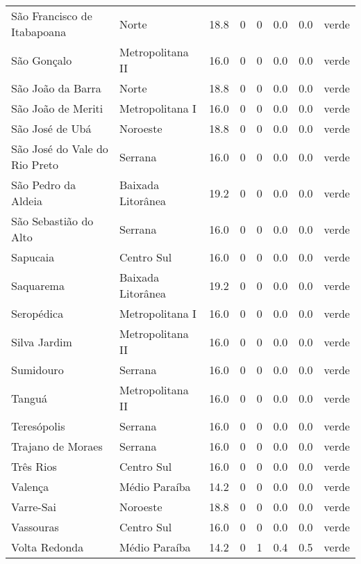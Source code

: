\begin{longtable}{l|lllllll}
  São Francisco de Itabapoana & Norte & 18.8 & 0 & 0 & 0.0 & 0.0 & verde \\ 
  São Gonçalo & Metropolitana II & 16.0 & 0 & 0 & 0.0 & 0.0 & verde \\ 
  São João da Barra & Norte & 18.8 & 0 & 0 & 0.0 & 0.0 & verde \\ 
  São João de Meriti & Metropolitana I & 16.0 & 0 & 0 & 0.0 & 0.0 & verde \\ 
  São José de Ubá & Noroeste & 18.8 & 0 & 0 & 0.0 & 0.0 & verde \\ 
  São José do Vale do Rio Preto & Serrana & 16.0 & 0 & 0 & 0.0 & 0.0 & verde \\ 
  São Pedro da Aldeia & Baixada Litorânea & 19.2 & 0 & 0 & 0.0 & 0.0 & verde \\ 
  São Sebastião do Alto & Serrana & 16.0 & 0 & 0 & 0.0 & 0.0 & verde \\ 
  Sapucaia & Centro Sul & 16.0 & 0 & 0 & 0.0 & 0.0 & verde \\ 
  Saquarema & Baixada Litorânea & 19.2 & 0 & 0 & 0.0 & 0.0 & verde \\ 
  Seropédica & Metropolitana I & 16.0 & 0 & 0 & 0.0 & 0.0 & verde \\ 
  Silva Jardim & Metropolitana II & 16.0 & 0 & 0 & 0.0 & 0.0 & verde \\ 
  Sumidouro & Serrana & 16.0 & 0 & 0 & 0.0 & 0.0 & verde \\ 
  Tanguá & Metropolitana II & 16.0 & 0 & 0 & 0.0 & 0.0 & verde \\ 
  Teresópolis & Serrana & 16.0 & 0 & 0 & 0.0 & 0.0 & verde \\ 
  Trajano de Moraes & Serrana & 16.0 & 0 & 0 & 0.0 & 0.0 & verde \\ 
  Três Rios & Centro Sul & 16.0 & 0 & 0 & 0.0 & 0.0 & verde \\ 
  Valença & Médio Paraíba & 14.2 & 0 & 0 & 0.0 & 0.0 & verde \\ 
  Varre-Sai & Noroeste & 18.8 & 0 & 0 & 0.0 & 0.0 & verde \\ 
  Vassouras & Centro Sul & 16.0 & 0 & 0 & 0.0 & 0.0 & verde \\ 
  Volta Redonda & Médio Paraíba & 14.2 & 0 & 1 & 0.4 & 0.5 & verde \\ 
  \hline
\end{longtable}
